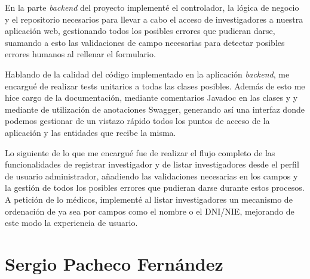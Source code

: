 En la parte \textit{backend} del proyecto implementé el controlador, la lógica de negocio y el repositorio necesarios para llevar a cabo el acceso de investigadores a nuestra aplicación web, gestionando todos los posibles errores que pudieran darse, suamando a esto las validaciones de campo necesarias para detectar posibles errores humanos al rellenar el formulario. \newline

Hablando de la calidad del código implementado en la aplicación \textit{backend}, me encargué de realizar tests unitarios a todas las clases posibles. Además de esto me hice cargo de la documentación, mediante comentarios Javadoc en las clases y y mediante de utilización de anotaciones Swagger, generando así una interfaz donde podemos gestionar de un vistazo rápido todos los puntos de acceso de la aplicación y las entidades que recibe la misma. \newline

Lo siguiente de lo que me encargué fue de realizar el flujo completo de las funcionalidades de registrar investigador y de listar investigadores desde el perfil de usuario administrador, añadiendo las validaciones necesarias en los campos y la gestión de todos los posibles errores que pudieran darse durante estos procesos. A petición de lo médicos, implementé al listar investigadores un mecanismo de ordenación de ya sea por campos como el nombre o el DNI/NIE, mejorando de este modo la experiencia de usuario. \newline







\section{Sergio Pacheco Fernández}